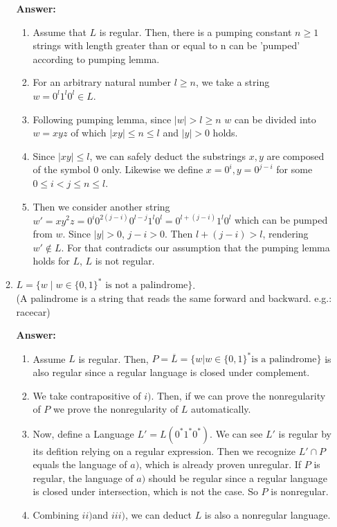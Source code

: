\documentclass[paper=a4, fontsize=11pt]{scrartcl}
\begin{document}
\begin{enumerate}
\begin{enumerate}
\vspace{1cm}
\textbf{Answer:}
	\begin{enumerate}
		\item Assume that $L$ is regular. Then, there is a pumping constant $n\ge1$ strings with length
			greater than or equal to n can be 'pumped' according to pumping lemma.
		\item For an arbitrary natural number $l\ge n$, we take a string $w = 0^l1^l0^l\in L$.
		\item Following pumping lemma, since $|w|> l \ge n$ $w$ can be divided into $w=xyz$ of which
			$|xy|\le n \le l$ and  $|y| > 0$ holds.
		\item Since $|xy| \le l$, we can safely deduct the substrings $x, y$ are composed of the symbol 				$0$ only. Likewise we define $x=0^i, y=0^{j-i}$ for some $0 \le i < j \le n \le l$.
		\item Then we consider another string $w'=xy^2z=0^i0^{2(j-i)}0^{l-j}1^l0^l=0^{l+(j-i)}1^l0^l$ which
			can be pumped from $w$. Since $|y| > 0$, $j-i >0$. Then $l + (j-i) > l$, rendering $w' \notin 
			L$. For that contradicts our assumption that the pumping lemma holds for $L$, $L$ is not 				regular.
	\end{enumerate}
\newpage

\item $L = \{w  \mid w \in \{0, 1\}^* \textrm{~is not a
palindrome}\}$.\\
(A palindrome is a string that reads the same forward and backward.
e.g.: racecar)

\vspace{1cm}
\textbf{Answer:}
	\begin{enumerate}
		\item Assume $L$ is regular. Then, $P = \overline{L} = \{w|w \in \{0,1\}^* \text{is a palindrome} \}$ is also
			regular since a regular language is closed under complement.
		\item We take contrapositive of $i)$. Then, if we can prove the nonregularity of $P$ we prove 
			the nonregularity of $L$ automatically.
		\item Now, define a Language $L'=L(0^*1^*0^*)$. We can see $L'$ is regular by its defition relying on 				a regular expression. Then we recognize $L'\cap P$ equals the language of $a)$, which is 				already proven unregular. If $P$ is regular, the language of $a)$ should be regular since a
			regular language is closed under intersection, which is not the case. So $P$ is nonregular.
		\item Combining $ii)$and $iii)$, we can deduct $L$ is also a nonregular language.
	\end{enumerate}
\end{enumerate}


\end{enumerate}
\end{document}
